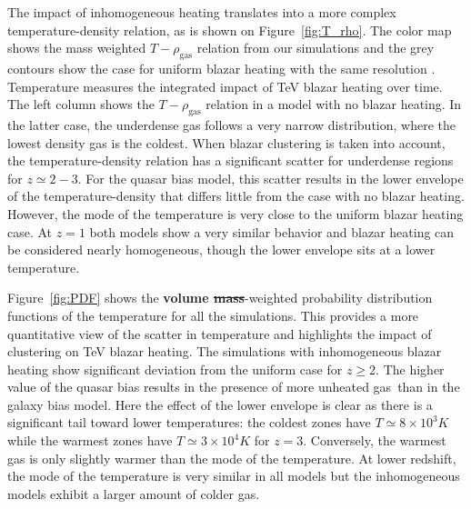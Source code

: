 \documentclass[numberedappendix]{emulateapj}
\newcommand\ALc[1]{{\color{red} \bf #1}} %
\begin{document}
The impact of inhomogeneous heating translates into a more complex temperature-density relation, as is shown on Figure~\ref{fig:T_rho}. The color map shows the mass weighted $T-\rho_{\mathrm{gas}}$ relation from our simulations and the grey contours show the case for uniform blazar heating with the same resolution \citep{2012MNRAS.423..149P}. Temperature measures the integrated impact of TeV blazar heating over time. The left column shows the $T-\rho_{\mathrm{gas}}$ relation in a model with no blazar heating. In the latter case, the underdense gas follows a very narrow distribution, where the lowest density gas is the coldest.  When blazar clustering is taken into account, the temperature-density relation has a significant scatter for underdense regions for $z\simeq 2-3$. For the quasar bias model, this scatter results in the lower envelope of the temperature-density that differs little from the case with no blazar heating. However, the mode of the temperature is very close to the uniform blazar heating case. At $z=1$  both models show a very similar behavior and blazar heating can be considered nearly homogeneous, though the lower envelope sits at a lower temperature.

Figure~\ref{fig:PDF} shows the \ALc{volume \sout{mass}}-weighted probability distribution functions of the temperature for all the simulations. This provides a more quantitative view of the scatter in temperature and highlights the impact of clustering on TeV blazar heating. The simulations with  inhomogeneous blazar heating show significant deviation from the uniform case  for $z\geqslant 2$. The higher value of the quasar bias results in the presence of more unheated gas\ than in the galaxy bias model. Here the effect of the lower envelope is clear as there is a significant tail toward lower temperatures: the coldest zones have $T\simeq 8 \times 10^3K$ while the warmest zones have $T\simeq 3\times 10^4K$ for $z=3$. Conversely, the warmest gas is only slightly warmer than the mode of the temperature. At lower redshift, the mode of the temperature is very similar in all models but the inhomogeneous models exhibit a larger amount of colder gas.

\end{document}

